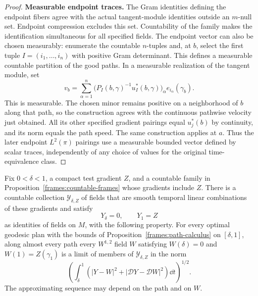 \begin{proof}
 \textbf{Measurable endpoint traces.}
 The Gram identities defining the endpoint fibers
 agree with the actual tangent-module identities outside an
 $m$-null set.  Endpoint compression excludes this set.
 Countability of the family makes the identification
 simultaneous for all specified fields.  The endpoint vector can
 also be chosen measurably: enumerate the countable $n$-tuples and,
 at $b$, select the first tuple $I=(i_1,\ldots,i_n)$ with positive
 Gram determinant.  This defines a measurable countable partition
 of the good paths.  In a measurable realization of the tangent
 module, set
 \begin{equation}\label{frames:measurable-endpoint-velocity}
  v_b=\sum_{\alpha=1}^n
      \bigl(P_I(b,\gamma)^{-1}u_I^*(b,\gamma)\bigr)_\alpha
                   e_{i_\alpha}(\gamma_b).
 \end{equation}
 This is measurable.  The chosen minor remains positive on a
 neighborhood of $b$ along that path, so the construction agrees
 with the continuous pathwise velocity just obtained.  All its
 other specified gradient pairings equal $u_j^*(b)$ by continuity,
 and its norm equals the path speed.  The same construction applies
 at $a$.  Thus the later endpoint $L^2(\pi)$ pairings use a
 measurable bounded vector defined by scalar traces, independently
 of any choice of values for the original time-equivalence class.
\end{proof}

\begin{lemma}
 \label{frames:trial-density}
 Fix $0<\delta<1$, a compact test gradient $Z$, and a countable
 family in Proposition~\ref{frames:countable-frames} whose gradients
 include $Z$.  There is a countable collection $\mathcal Y_{\delta,Z}$
 of fields that are smooth temporal linear combinations of
 these gradients and satisfy
 \[
  Y_\delta=0,\qquad Y_1=Z
 \]
 as identities of fields on $M$, with the following property.
 For every optimal geodesic plan with the bounds of
 Proposition~\ref{frames:path-calculus} on $[\delta,1]$, along
 almost every path every $W^{1,2}$ field $W$ satisfying
 $W(\delta)=0$ and $W(1)=Z(\gamma_1)$ is a limit of members
 of $\mathcal Y_{\delta,Z}$ in the norm
 \[
  \left(\int_\delta^1
       (|Y-W|^2+|\mathcal DY-\mathcal DW|^2)\dd t\right)^{1/2}.
 \]
 The approximating sequence may depend on the path and on $W$.
\end{lemma}

